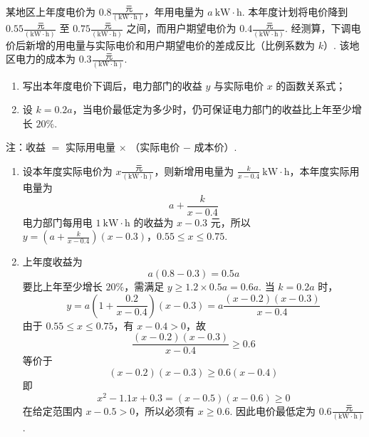 \begin{problem}
某地区上年度电价为 \(0.8\frac{\text{ 元}}{(\mathrm{kW\cdot h})}\)，年用电量为 \(a\mathrm{~kW\cdot h}\). 本年度计划将电价降到 \(0.55\frac{\text{ 元}}{(\mathrm{kW\cdot h})}\) 至 \(0.75\frac{\text{ 元}}{(\mathrm{kW\cdot h})}\) 之间，而用户期望电价为 \(0.4\frac{\text{ 元}}{(\mathrm{kW\cdot h})}\). 经测算，下调电价后新增的用电量与实际电价和用户期望电价的差成反比（比例系数为 \(k\)）. 该地区电力的成本为 \(0.3\frac{\text{ 元}}{(\mathrm{kW\cdot h})}\).

\begin{enumerate}
\item 写出本年度电价下调后，电力部门的收益 \(y\) 与实际电价 \(x\) 的函数关系式；
\item 设 \(k = 0.2a\)，当电价最低定为多少时，仍可保证电力部门的收益比上年至少增长 \(20\%\).
\end{enumerate}

注：收益 \(=\) 实际用电量 \(\times\) （实际电价 \(-\) 成本价）.
\end{problem}

\begin{solution}
\begin{enumerate}
\item 设本年度实际电价为 \(x\frac{\text{ 元}}{(\mathrm{kW\cdot h})}\)，则新增用电量为 \(\frac{k}{x-0.4}\mathrm{~kW\cdot h}\)，本年度实际用电量为
\[
a+\frac{k}{x-0.4}
\]
电力部门每用电 \(1\mathrm{~kW\cdot h}\) 的收益为 \(x-0.3\) 元，所以
\(y=\left(a+\frac{k}{x-0.4}\right)(x-0.3)\)，\(0.55\le x\le0.75\).

\item 上年度收益为
\[
a\left(0.8-0.3\right)=0.5a
\]
要比上年至少增长 \(20\%\)，需满足 \(y\ge1.2\times0.5a=0.6a\). 当 \(k=0.2a\) 时，
\[
y=a\left(1+\frac{0.2}{x-0.4}\right)(x-0.3)=a\frac{(x-0.2)(x-0.3)}{x-0.4}
\]
由于 \(0.55\le x\le0.75\)，有 \(x-0.4>0\)，故
\[
\frac{(x-0.2)(x-0.3)}{x-0.4}\ge0.6
\]
等价于
\[
(x-0.2)(x-0.3)\ge0.6(x-0.4)
\]
即
\[
x^2-1.1x+0.3=(x-0.5)(x-0.6)\ge0
\]
在给定范围内 \(x-0.5>0\)，所以必须有 \(x\ge0.6\). 因此电价最低定为 \(0.6\frac{\text{ 元}}{(\mathrm{kW\cdot h})}\).
\end{enumerate}
\end{solution}
